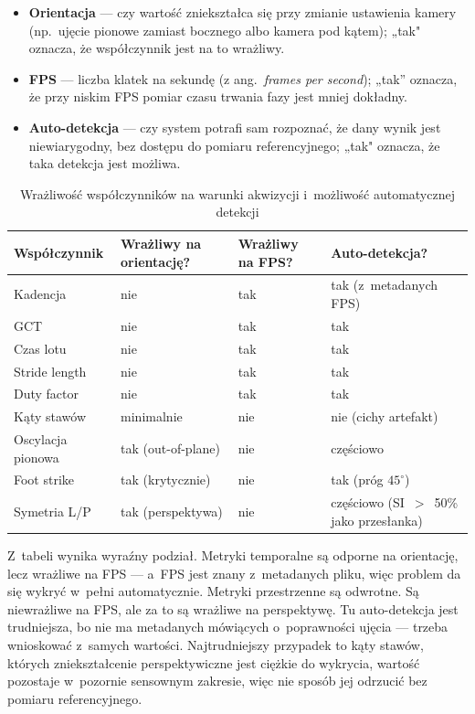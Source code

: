\begin{itemize}
    \item \textbf{Orientacja} --- czy wartość zniekształca się przy zmianie ustawienia kamery (np.~ujęcie pionowe zamiast bocznego albo kamera pod kątem); „tak" oznacza, że współczynnik jest na to wrażliwy.
    \item \textbf{FPS} --- liczba klatek na sekundę (z ang.\ \textit{frames per second}); „tak” oznacza, że przy niskim FPS pomiar czasu trwania fazy jest mniej dokładny.

    \item \textbf{Auto-detekcja} --- czy system potrafi sam rozpoznać, że dany wynik jest niewiarygodny, bez dostępu do pomiaru referencyjnego; „tak" oznacza, że taka detekcja jest możliwa.
\end{itemize}

\begin{table}[htbp]
\centering
\caption{Wrażliwość współczynników na warunki akwizycji i~możliwość automatycznej detekcji}
\label{tab:wrazliwosc-synteza}
\small
\begin{tabular}{p{3.4cm}p{2.8cm}p{2.4cm}p{3.4cm}}
\hline
\textbf{Współczynnik} & \textbf{Wrażliwy na orientację?} & \textbf{Wrażliwy na FPS?} & \textbf{Auto-detekcja?} \\
\hline
Kadencja            & nie & tak & tak (z~metadanych FPS) \\
GCT                 & nie & tak & tak \\
Czas lotu           & nie & tak & tak \\
Stride length       & nie & tak & tak \\
Duty factor         & nie & tak & tak \\
Kąty stawów         & minimalnie & nie & nie (cichy artefakt) \\
Oscylacja pionowa   & tak (out-of-plane) & nie & częściowo \\
Foot strike         & tak (krytycznie) & nie & tak (próg $45^\circ$) \\
Symetria L/P        & tak (perspektywa) & nie & częściowo (SI~$>$~50\% jako przesłanka) \\
\hline
\end{tabular}
\end{table}

Z~tabeli wynika wyraźny podział. Metryki temporalne są odporne na orientację, lecz wrażliwe na FPS --- a~FPS jest znany z~metadanych pliku, więc problem da się wykryć w~pełni automatycznie. Metryki przestrzenne są odwrotne. Są niewrażliwe na FPS, ale za to są wrażliwe na perspektywę. Tu auto-detekcja jest trudniejsza, bo nie ma metadanych mówiących o~poprawności ujęcia --- trzeba wnioskować z~samych wartości. Najtrudniejszy przypadek to kąty stawów, których zniekształcenie perspektywiczne jest ciężkie do wykrycia, wartość pozostaje w~pozornie sensownym zakresie, więc nie sposób jej odrzucić bez pomiaru referencyjnego.

